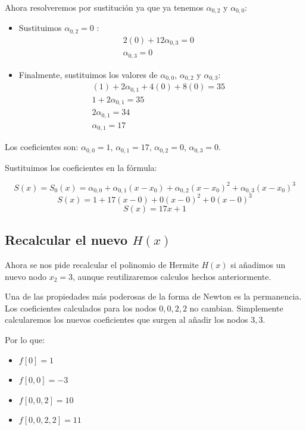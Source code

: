 \documentclass{article}
\begin{document}
Ahora resolveremos por sustitución ya que ya tenemos \(\alpha_{0,2}\) y \(\alpha_{0,0}\):
\begin{itemize}
    \item Sustituimos \(\alpha_{0,2}=0\) :
    \begin{align*}
    &2(0) + 12\alpha_{0,3} = 0 &&\\
    &\alpha_{0,3} = 0 &&
    \end{align*}
    \item Finalmente, sustituimos los valores de \(\alpha_{0,0}\), \(\alpha_{0,2}\) y \(\alpha_{0,3}\):
    \begin{align*}
    &(1) + 2\alpha_{0,1} + 4(0) + 8(0) = 35 &&\\
    &1 + 2\alpha_{0,1} = 35 &&\\
    &2\alpha_{0,1} = 34 &&\\
    &\alpha_{0,1} = 17 &&
    \end{align*}
\end{itemize}
Los coeficientes son: \(\alpha_{0,0} = 1\), \(\alpha_{0,1} = 17\), \(\alpha_{0,2} = 0\), \(\alpha_{0,3} = 0\).

Sustituimos los coeficientes en la fórmula:

$$ S(x) = S_0(x) = \alpha_{0,0} + \alpha_{0,1}(x-x_0) + \alpha_{0,2}(x-x_0)^2 + \alpha_{0,3}(x-x_0)^3 $$
$$ S(x) = 1 + 17(x-0) + 0(x-0)^2 + 0(x-0)^3 $$
$$ \boxed{S(x) = 17x + 1} $$

\subsection{Recalcular el nuevo $H(x)$}

Ahora se nos pide recalcular el polinomio de Hermite $H(x)$ si añadimos un nuevo nodo \(x_2 = 3\), aunque reutilizaremos calculos hechos anteriormente.

Una de las propiedades más poderosas de la forma de Newton es la permanencia. Los coeficientes calculados para los nodos \(0,0,2,2\) no cambian. Simplemente calcularemos los nuevos coeficientes que surgen al añadir los nodos \(3,3\).

Por lo que:


\begin{itemize}
    \item \(f[0] = 1\)
    \item \(f[0,0] = -3\)
    \item \(f[0,0,2] = 10\)
    \item \(f[0,0,2,2] = 11\)
\end{itemize}
\end{document}
